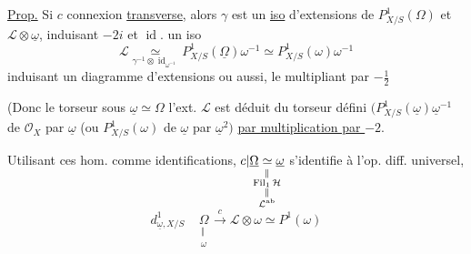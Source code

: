 \uline{Prop.} Si $c$ connexion \uline{transverse},  alors $\gamma$ est un \uline{iso} d'extensions de $P^1_{X/S}(\Omega)$
et $\mathcal{L}\otimes\underline{\omega}$, induisant $-2i$ et $\operatorname{id}$.  un iso
\[
\mathcal{L}\underset{\gamma^{-1}\otimes\operatorname{id}_{\omega^{-1}}}{\simeq}P^1_{X/S}(\underline{\Omega})\omega^{-1}\simeq P^1_{X/S}(\omega)\omega^{-1}
\]
induisant un diagramme d'extensions
\margin{\textcircled{$\alpha$}}
ou aussi, le multipliant par $-\frac12$

(Donc le torseur sous $\underline{\omega}\simeq\Omega$  l'ext. $\mathcal{L}$ est déduit du torseur  défini  $(P^1_{X/S}(\underline{\omega})\underline{\omega}^{-1}$ de $\mathcal{O}_X$ par $\underline{\omega}$ (ou $P^1_{X/S}(\omega)$ de $\underline{\omega}$ par $\underline{\omega}^2)$ \uline{par multiplication par $-2$}.

Utilisant ces hom. comme identifications,
$c|\underset{\substack{\Vert\\\operatorname{Fil}_1\mathcal{H}\\\Vert\\\mathcal{L}^{{\mathrm{ab}}}}}{\underline{\Omega}\simeq\underline{\omega}}$ s'identifie à l'op. diff. universel,
\[
d^1_{\underline{\omega},X/S}\quad
\underset{\substack{\Vert\\\omega}}{\Omega}\xrightarrow{c}\mathcal{L}\otimes\omega\simeq P^1(\omega)
\]

